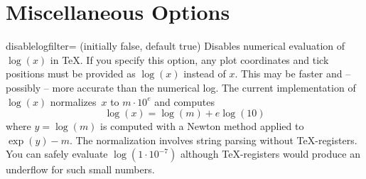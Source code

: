 

\section{Miscellaneous Options}
\label{pgfplots:misc}

\begin{pgfplotskey}{disablelogfilter= (initially false, default true)}
Disables numerical evaluation of $\log(x)$ in \TeX. If you specify this option, any plot coordinates and tick positions must be provided as $\log(x)$ instead of $x$. This may be faster and -- possibly -- more accurate than the numerical log. The current implementation of $\log(x)$ normalizes~$x$ to $m\cdot 10^e$ and computes
\[ \log(x) = \log(m) + e \log(10) \]
where $y = \log(m)$ is computed with a Newton method applied to $\exp(y) - m$. The normalization involves string parsing without \TeX-registers. You can safely evaluate $\log(1\cdot 10^{-7})$ although \TeX-registers would produce an underflow for such small numbers. 
\end{pgfplotskey}

